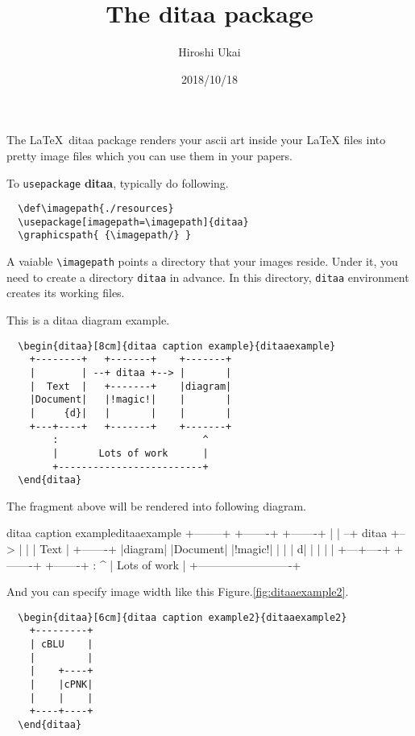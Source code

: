 \documentclass[pagesize=auto]{scrartcl}
\title{The \textsf{ditaa} package}
\author{Hiroshi Ukai}
\date{2018/10/18}
\def\imagepath{./resources}
\begin{document}
\maketitle

\noindent
The \LaTeX\ \textsf{ditaa} package renders your ascii art inside your LaTeX files into pretty image files which you can use them in your papers.

To \texttt{usepackage} \textbf{ditaa}, typically do following.
\begin{verbatim}
  \def\imagepath{./resources}
  \usepackage[imagepath=\imagepath]{ditaa}
  \graphicspath{ {\imagepath/} }
\end{verbatim}

A vaiable \texttt{\textbackslash imagepath} points a directory that your images reside.
Under it, you need to create a directory \texttt{ditaa} in advance.
In this directory, \texttt{ditaa} environment creates its working files.

%
This is a ditaa diagram example.
\begin{verbatim}
  \begin{ditaa}[8cm]{ditaa caption example}{ditaaexample}
    +--------+   +-------+    +-------+
    |        | --+ ditaa +--> |       |
    |  Text  |   +-------+    |diagram|
    |Document|   |!magic!|    |       |
    |     {d}|   |       |    |       |
    +---+----+   +-------+    +-------+
        :                         ^
        |       Lots of work      |
        +-------------------------+
  \end{ditaa}
\end{verbatim}

The fragment above will be rendered into following diagram.

\begin{ditaa}[8cm]{ditaa caption example}{ditaaexample}
  +--------+   +-------+    +-------+
  |        | --+ ditaa +--> |       |
  |  Text  |   +-------+    |diagram|
  |Document|   |!magic!|    |       |
  |     {d}|   |       |    |       |
  +---+----+   +-------+    +-------+
      :                         ^
      |       Lots of work      |
      +-------------------------+
\end{ditaa}
\pagebreak
And you can specify image width like this Figure.\ref{fig:ditaaexample2}.

\begin{verbatim}
  \begin{ditaa}[6cm]{ditaa caption example2}{ditaaexample2}
    +---------+
    | cBLU    |
    |         |
    |    +----+
    |    |cPNK|
    |    |    |
    +----+----+
  \end{ditaa}
\end{verbatim}
\end{document}
